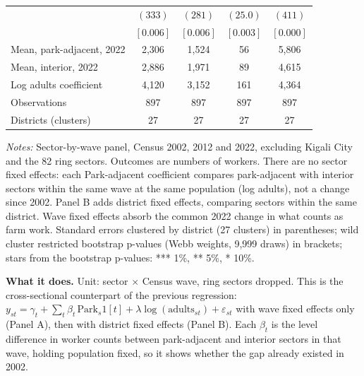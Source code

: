 \documentclass[11pt]{article}
\begin{document}
\begin{table}[H]
\begin{tabular}{lcccc}
 & $(333)$ & $(281)$ & $(25.0)$ & $(411)$ \\
 & $[0.006]$ & $[0.006]$ & $[0.003]$ & $[0.000]$ \\
Mean, park-adjacent, 2022 & 2,306 & 1,524 & 56 & 5,806 \\
Mean, interior, 2022 & 2,886 & 1,971 & 89 & 4,615 \\
Log adults coefficient & 4,120 & 3,152 & 161 & 4,364 \\
\midrule
Observations & 897 & 897 & 897 & 897 \\
Districts (clusters) & 27 & 27 & 27 & 27 \\
\bottomrule
\end{tabular}
\begin{minipage}{0.95\textwidth}\footnotesize
\textit{Notes:} Sector-by-wave panel, Census 2002, 2012 and 2022, excluding Kigali City and the 82 ring sectors. Outcomes are numbers of workers. There are no sector fixed effects: each Park-adjacent coefficient compares park-adjacent with interior sectors within the same wave at the same population (log adults), not a change since 2002. Panel B adds district fixed effects, comparing sectors within the same district. Wave fixed effects absorb the common 2022 change in what counts as farm work. Standard errors clustered by district (27 clusters) in parentheses; wild cluster restricted bootstrap p-values (Webb weights, 9,999 draws) in brackets; stars from the bootstrap p-values: *** 1\%, ** 5\%, * 10\%.
\end{minipage}
\end{table}
\textbf{What it does.} Unit: sector $\times$ Census wave, ring sectors dropped. This is the cross-sectional counterpart of the previous regression: $y_{st} = \gamma_t + \sum_t \beta_t\,\mathrm{Park}_s 1[t] + \lambda \log(\mathrm{adults}_{st}) + \varepsilon_{st}$ with wave fixed effects only (Panel A), then with district fixed effects (Panel B). Each $\beta_t$ is the level difference in worker counts between park-adjacent and interior sectors in that wave, holding population fixed, so it shows whether the gap already existed in 2002.
\end{document}
